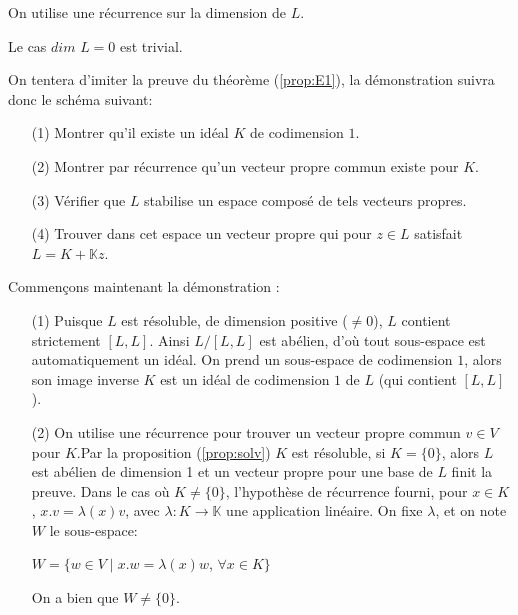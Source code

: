 \documentclass[a4paper,openany,12pt]{report}
\newcommand{\KK}{\mathbb{K}}
\theoremstyle{break}
{\theorembodyfont{\upshape}
\newtheorem*{rmq}{Remarque :}
\newtheorem*{prv}{Preuve :}
\newtheorem*{ex}{Exemples :}
\newtheorem*{exe}{Exemple : }
\newtheorem*{nota}{Notation :}
\newtheorem*{dem}{D\'emonstration :}}
\begin{document}
\begin{dem}
\quad On utilise une récurrence sur la dimension de $L$.

Le cas $dim$ $L=0$ est trivial.

On tentera d'imiter la preuve du théorème (\ref{prop:E1}), la démonstration suivra donc le schéma suivant:
\begin{itemize}
\item[(1)] Montrer qu'il existe un idéal $K$ de codimension $1$.
\item[(2)] Montrer par récurrence qu'un vecteur propre commun existe pour $K$.
\item[(3)] Vérifier que $L$ stabilise un espace composé de tels vecteurs propres.
\item[(4)] Trouver dans cet espace un vecteur propre qui pour $z \in L$ satisfait $L=K+\KK z$.
\end{itemize}
Commençons maintenant la démonstration :
\begin{itemize}
\item[(1)] Puisque $L$ est résoluble, de dimension positive ($\neq  0$), $L$ contient strictement $[L,L]$. Ainsi $L/[L,L]$ est abélien, d'où tout sous-espace est automatiquement un idéal. On prend un sous-espace de codimension $1$, alors son image inverse $K$ est un idéal de codimension $1$ de $L$ (qui contient $[L,L]$).

\item[(2)] On utilise une récurrence pour trouver un vecteur propre commun $v \in V$ pour $K$.Par la proposition (\ref{prop:solv}) $K$ est résoluble, si $K = \{ 0 \}$, alors $L$ est abélien de dimension 1 et un vecteur propre pour une base de $L$ finit la preuve. Dans le cas où $K \neq \{ 0 \}$, l'hypothèse de récurrence fourni, pour $x \in K$, $x.v= \lambda(x)v$, avec $\lambda : K \to \KK$ une application linéaire. On fixe $\lambda$, et on note $W$ le sous-espace:
\begin{center}
$W=\{ w \in V \mid x.w= \lambda(x)w$, $\forall x \in K \} $
\end{center}
On a bien que $W \neq \{0\}$.


\end{itemize}
\end{dem}
\end{document}

